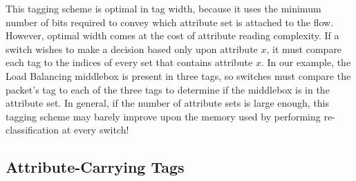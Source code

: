 
This tagging scheme is optimal in tag width, because it uses the minimum number of bits required to convey which attribute set is attached to the flow. However, optimal width comes at the cost of attribute reading complexity. If a switch wishes to make a decision based only upon attribute $x$, it must compare each tag to the indices of every set that contains attribute $x$. In our example, the Load Balancing middlebox is present in three tags, so switches must compare the packet's tag to each of the three tags to determine if the middlebox is in the attribute set. In general, if the number of attribute sets is large enough, this tagging scheme may barely improve upon the memory used by performing re-classification at every switch!







\subsection{Attribute-Carrying Tags}

